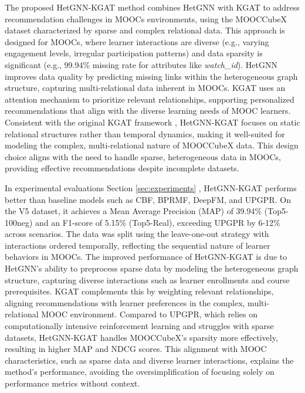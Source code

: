 \documentclass{ieeeaccess}
\begin{document}
The proposed HetGNN-KGAT method combines HetGNN with KGAT to address recommendation challenges in MOOCs environments, using the MOOCCubeX dataset characterized by sparse and complex relational data. This approach is designed for MOOCs, where learner interactions are diverse (e.g., varying engagement levels, irregular participation patterns) and data sparsity is significant (e.g., 99.94\% missing rate for attributes like \textit{watch\_id}). HetGNN improves data quality by predicting missing links within the heterogeneous graph structure, capturing multi-relational data inherent in MOOCs. KGAT uses an attention mechanism to prioritize relevant relationships, supporting personalized recommendations that align with the diverse learning needs of MOOC learners. Consistent with the original KGAT framework \cite{wang2019kgat}, HetGNN-KGAT focuses on static relational structures rather than temporal dynamics, making it well-suited for modeling the complex, multi-relational nature of MOOCCubeX data. This design choice aligns with the need to handle sparse, heterogeneous data in MOOCs, providing effective recommendations despite incomplete datasets.

In experimental evaluations Section \ref{sec:experiments} , HetGNN-KGAT performs better than baseline models such as CBF, BPRMF, DeepFM, and UPGPR. On the V5 dataset, it achieves a Mean Average Precision (MAP) of 39.94\% (Top5-100neg) and an F1-score of 5.15\% (Top5-Real), exceeding UPGPR by 6-12\% across scenarios. The data was split using the leave-one-out strategy with interactions ordered temporally, reflecting the sequential nature of learner behaviors in MOOCs. The improved performance of HetGNN-KGAT is due to HetGNN’s ability to preprocess sparse data by modeling the heterogeneous graph structure, capturing diverse interactions such as learner enrollments and course prerequisites. KGAT complements this by weighting relevant relationships, aligning recommendations with learner preferences in the complex, multi-relational MOOC environment. Compared to UPGPR, which relies on computationally intensive reinforcement learning and struggles with sparse datasets, HetGNN-KGAT handles MOOCCubeX’s sparsity more effectively, resulting in higher MAP and NDCG scores. This alignment with MOOC characteristics, such as sparse data and diverse learner interactions, explains the method’s performance, avoiding the oversimplification of focusing solely on performance metrics without context.
\end{document}
